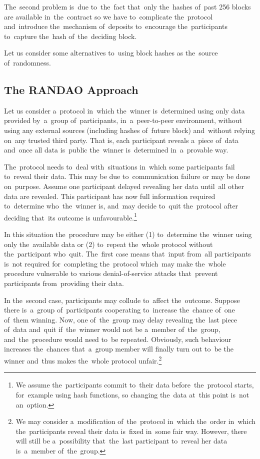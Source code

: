 \documentclass[a4paper]{article}
\begin{document}
    The~second problem is~due to~the~fact that~only the~hashes of~past 256 blocks are available in~the~contract
    so we have to~complicate the~protocol and~introduce the~mechanism of~deposits to~encourage the~participants
    to~capture the~hash of~the~deciding block.

    Let us consider some alternatives to~using block hashes as the~source of~randomness.

    \subsection{The RANDAO Approach}
    Let us consider a~protocol in~which the~winner is~determined using only data provided by~a~group of~participants,
    in~a~peer-to-peer environment, without using any external sources (including hashes of~future block) and~without
    relying on~any trusted third party. That is, each participant reveals a~piece of~data and~once all data is~public
    the~winner is~determined in~a~provable way.

    The~protocol needs to~deal with~situations in~which some participants fail to~reveal their data. This may be due
    to~communication failure or may be done on~purpose. Assume one participant delayed revealing her data until~all
    other data are revealed. This participant has now full information required to~determine who~the~winner is,
    and~may decide to~quit the~protocol after deciding that~its outcome is unfavourable.\footnote{We assume
    the~participants commit to~their data before~the~protocol starts, for~example using hash functions,
    so changing the~data at~this point is~not an~option.}

    In this situation the~procedure may be either (1) to~determine the~winner using only the~available data or (2)
    to~repeat the~whole protocol without the~participant who~quit. The~first case means that~input from~all
    participants is~not required for~completing the~protocol which~may make the~whole procedure vulnerable to
    various denial-of-service attacks that~prevent participants from~providing their data.

    In the~second case, participants may collude to~affect the~outcome. Suppose there is~a~group of~participants
    cooperating to~increase the~chance of~one of~them winning. Now, one of~the~group may delay revealing the~last
    piece of~data and~quit if~the~winner would not be a~member of~the~group, and~the~procedure would need to~be
    repeated. Obviously, such behaviour increases the~chances that~a~group member will finally turn out to~be the
    winner and~thus makes the~whole protocol unfair.\footnote{We may consider a~modification of~the~protocol in~which
    the~order in~which the~participants reveal their data is~fixed in~some fair way. However, there will still be
    a~possibility that~the~last participant to~reveal her data is~a~member of~the~group.}
\end{document}

